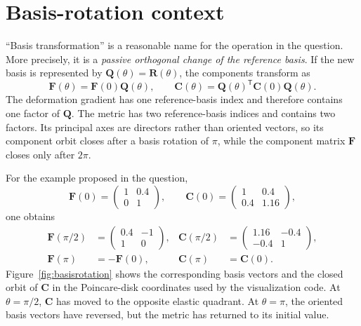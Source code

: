 \documentclass[11pt]{article}
\newcommand{\trans}{\mathsf{T}}
\begin{document}
\section{Basis-rotation context}

``Basis transformation'' is a reasonable name for the operation in the
question.  More precisely, it is a \emph{passive orthogonal change of the
reference basis}.  If the new basis is represented by
\(\mathbf Q(\theta)=\mathbf R(\theta)\), the components transform as
\begin{equation}
 \mathbf F(\theta)=\mathbf F(0)\mathbf Q(\theta),
 \qquad
 \mathbf C(\theta)=\mathbf Q(\theta)^\trans
                     \mathbf C(0)\mathbf Q(\theta).
 \label{eq:basisrotation}
\end{equation}
The deformation gradient has one reference-basis index and therefore contains
one factor of \(\mathbf Q\).  The metric has two reference-basis indices and
contains two factors.  Its principal axes are directors rather than oriented
vectors, so its component orbit closes after a basis rotation of \(\pi\), while
the component matrix \(\mathbf F\) closes only after \(2\pi\).

For the example proposed in the question,
\begin{equation}
 \mathbf F(0)=\begin{pmatrix}1&0.4\\0&1\end{pmatrix},
 \qquad
 \mathbf C(0)=\begin{pmatrix}1&0.4\\0.4&1.16\end{pmatrix},
\end{equation}
one obtains
\begin{align}
 \mathbf F(\pi/2)&=
 \begin{pmatrix}0.4&-1\\1&0\end{pmatrix},
 &
 \mathbf C(\pi/2)&=
 \begin{pmatrix}1.16&-0.4\\-0.4&1\end{pmatrix},
 \\
 \mathbf F(\pi)&=-\mathbf F(0),
 &
 \mathbf C(\pi)&=\mathbf C(0).
\end{align}
Figure~\ref{fig:basisrotation} shows the corresponding basis vectors and the
closed orbit of \(\mathbf C\) in the Poincare-disk coordinates used by the
visualization code.  At \(\theta=\pi/2\), \(\mathbf C\) has moved to the
opposite elastic quadrant.  At \(\theta=\pi\), the oriented basis vectors have
reversed, but the metric has returned to its initial value.
\end{document}
